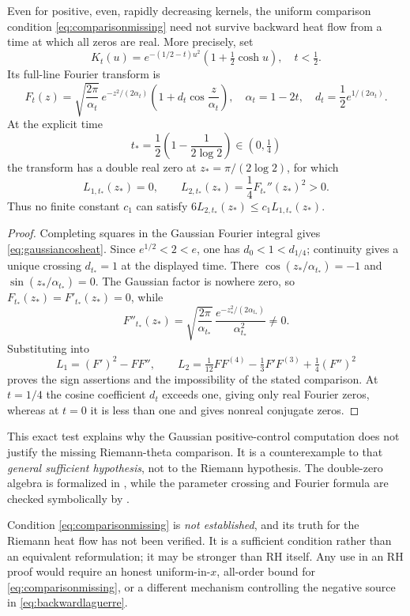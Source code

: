 \begin{proposition}
\label{prop:doublezerofailure}
Even for positive, even, rapidly decreasing kernels,
the uniform comparison condition
\eqref{eq:comparisonmissing} need not survive
backward heat flow from a time at which all
zeros are real. More precisely, set
\[
K_t(u)=e^{-(1/2-t)u^2}
\left(1+\tfrac12\cosh u\right),
\quad t<\tfrac12.
\]
Its full-line Fourier transform is
\begin{equation}
F_t(z)=\sqrt{\frac{2\pi}{\alpha_t}}\,
e^{-z^2/(2\alpha_t)}
\left(1+d_t\cos\frac z{\alpha_t}\right),
\quad
\alpha_t=1-2t,\quad
d_t=\frac12e^{1/(2\alpha_t)} .
\label{eq:gaussiancosheat}
\end{equation}
At the explicit time
\[
t_*=\frac12\left(1-\frac1{2\log2}\right)
\in(0,\tfrac14)
\]
the transform has a double real zero at
$z_*=\pi/(2\log2)$, for which
\[
L_{1,t_*}(z_*)=0,\qquad
L_{2,t_*}(z_*)=
\frac14F_{t_*}''(z_*)^2>0.
\]
Thus no finite constant $c_1$ can satisfy
$6L_{2,t_*}(z_*)\le c_1L_{1,t_*}(z_*)$.
\end{proposition}
\begin{proof}
Completing squares in the Gaussian
Fourier integral gives \eqref{eq:gaussiancosheat}.
Since $e^{1/2}<2<e$, one has
$d_0<1<d_{1/4}$; continuity gives
a unique crossing $d_{t_*}=1$
at the displayed time.
There $\cos(z_*/\alpha_{t_*})=-1$ and
$\sin(z_*/\alpha_{t_*})=0$.
The Gaussian factor is nowhere zero,
so $F_{t_*}(z_*)=F'_{t_*}(z_*)=0$, while
\[
F''_{t_*}(z_*)=
\sqrt{\frac{2\pi}{\alpha_{t_*}}}\,
\frac{e^{-z_*^2/(2\alpha_{t_*})}}{\alpha_{t_*}^2}
\ne0 .
\]
Substituting into
\[
L_1=(F')^2-FF'',\qquad
L_2=\tfrac1{12}FF^{(4)}
-\tfrac13F'F^{(3)}+\tfrac14(F'')^2
\]
proves the sign assertions and the impossibility
of the stated comparison.
At $t=1/4$ the cosine coefficient $d_t$
exceeds one, giving only real Fourier zeros,
whereas at $t=0$ it is less than one
and gives nonreal conjugate zeros.
\end{proof}

This exact test explains why the Gaussian
positive-control computation does not justify
the missing Riemann-theta comparison.
It is a counterexample to that \emph{general
sufficient hypothesis}, not to the Riemann
hypothesis. The double-zero algebra is
formalized in
,
while the parameter crossing and Fourier formula
are checked symbolically by
.

Condition \eqref{eq:comparisonmissing} is
\emph{not established}, and its truth for
the Riemann heat flow has not been verified.
It is a sufficient condition rather than an
equivalent reformulation; it may be
stronger than RH itself.
Any use in an RH proof would require an
honest uniform-in-$x$, all-order bound
for \eqref{eq:comparisonmissing}, or a
different mechanism controlling the
negative source in
\eqref{eq:backwardlaguerre}.

